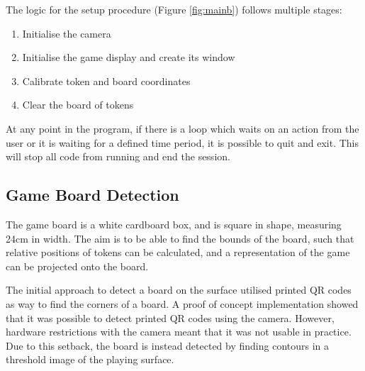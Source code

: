 \documentclass[12pt]{article}
\begin{document}
The logic for the setup procedure (Figure \ref{fig:mainb}) follows multiple stages:
\begin{enumerate}
    \item Initialise the camera
    \item Initialise the game display and create its window
    \item Calibrate token and board coordinates
    \item Clear the board of tokens
\end{enumerate}

At any point in the program, if there is a loop which waits on an action from the user or it is waiting for a defined time period, it is possible to quit and exit. This will stop all code from running and end the session. 

\subsection{Game Board Detection}
The game board is a white cardboard box, and is square in shape, measuring 24cm in width. The aim is to be able to find the bounds of the board, such that relative positions of tokens can be calculated, and a representation of the game can be projected onto the board. 

The initial approach to detect a board on the surface utilised printed QR codes as way to find the corners of a board. 
A proof of concept implementation showed that it was possible to detect printed QR codes using the camera.
However, hardware restrictions with the camera meant that it was not usable in practice. 
Due to this setback, the board is instead detected by finding contours in a threshold image of the playing surface. 
\end{document}
